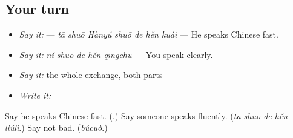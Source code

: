 \subsection*{Your turn}
\begin{itemize}
\raggedright
  \item \emph{Say it:}  — \emph{tā shuō Hànyǔ shuō de hěn kuài} — He speaks Chinese fast.
  \item \emph{Say it:} \emph{nǐ shuō de hěn qīngchu} — You speak clearly.
  \item \emph{Say it:} the whole exchange, both parts
  \item \emph{Write it:} 
\end{itemize}

\begin{tcolorbox}[breakable,colback=teal!4,colframe=teal!35!black,title={Before you move on}]
Say he speaks Chinese fast. (\textbf{}.) Say someone speaks fluently. (\emph{tā shuō de hěn liúlì}.) Say not bad. (\emph{búcuò}.)
\end{tcolorbox}
